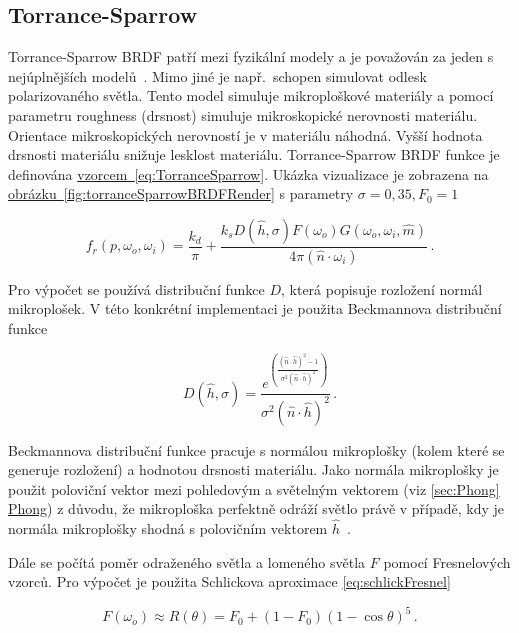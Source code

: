 \documentclass[czech,master]{diploma}
\newcommand{\uvec}[1]{\hat{#1}}
\newcommand{\point}{p}
\newcommand{\brdf}{f_r\left(\point,\omega_{o},\omega_{i}\right)}
\newcommand{\normVec}{\uvec{n}}
\newcommand{\normMicroVec}{\uvec{m}}
\newcommand{\inVec}{\omega_{i}}
\newcommand{\outVec}{\omega_{o}}
\newcommand{\halfVec}{\uvec{h}}
\newcommand{\rough}{\sigma}
\newcommand{\Fzero}{F_0}
\begin{document}
\subsection{Torrance-Sparrow} \label{sec:torrancesparrow}
Torrance-Sparrow BRDF patří mezi fyzikální modely a je považován za jeden s nejúplnějších modelů~\cite{BRDFOverview}. Mimo jiné je např.\ schopen simulovat odlesk polarizovaného světla. Tento model simuluje mikroploškové materiály a pomocí parametru roughness (drsnost) simuluje mikroskopické nerovnosti materiálu. Orientace mikroskopických nerovností je v materiálu náhodná. Vyšší hodnota drsnosti materiálu snižuje lesklost materiálu. Torrance-Sparrow BRDF funkce je definována \hyperref[eq:TorranceSparrow]{vzorcem~\ref{eq:TorranceSparrow}}. Ukázka vizualizace je zobrazena na \hyperref[fig:torranceSparrowBRDFRender]{obrázku~\ref{fig:torranceSparrowBRDFRender}} s parametry \(\rough=0{,}35, \Fzero = 1\)\par

\begin{equation}\label{eq:TorranceSparrow}
  \brdf  =  \frac{k_d}{\pi} + \frac{k_s D(\halfVec,\rough) F(\outVec) G(\outVec,\inVec, \normMicroVec)}{4\pi (\normVec \cdot \inVec)}\,.
\end{equation}

Pro výpočet se používá distribuční funkce \(D\), která popisuje rozložení normál mikroplošek. V této konkrétní implementaci je použita Beckmannova distribuční funkce

\begin{equation}\label{eq:beckDistr}
  D(\halfVec,\rough)  =  \frac{e^{\left(\frac{(\normVec\cdot \halfVec)^{2}-1}{\rough^{2}(\normVec \cdot \halfVec)^{2}}\right)}}{\rough^2(\normVec\cdot \halfVec)^{2}}\,.
\end{equation}

Beckmannova distribuční funkce pracuje s normálou mikroplošky (kolem které se generuje rozložení) a hodnotou drsnosti materiálu. Jako normála mikroplošky je použit poloviční vektor mezi pohledovým a světelným vektorem (viz \hyperref[sec:Phong]{\ref{sec:Phong} Phong}) z důvodu, že mikroploška perfektně odráží světlo právě v případě, kdy je normála mikroplošky shodná s polovičním vektorem \(\halfVec\)~\cite{PHARR2017507}.\par
Dále se počítá poměr odraženého světla a lomeného světla \(F\) pomocí Fresnelových vzorců. Pro výpočet je použita Schlickova aproximace \hyperref[eq:schlickFresnel]{\ref{eq:schlickFresnel}}~\cite{SchlickFresnel}

\begin{equation}\label{eq:schlickFresnel}
  F(\outVec)  \approx R(\theta) = \Fzero + {(1-\Fzero)}{(1-\cos\theta)}^{5}\,.
\end{equation}
\end{document}
